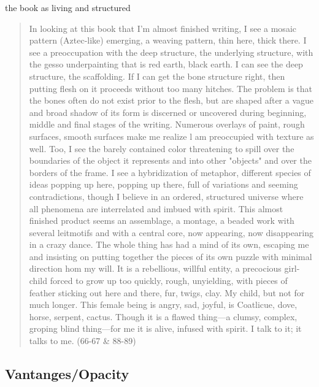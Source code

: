 \documentclass[11pt]{article}
\begin{document}
the book as living and structured
\begin{quote}
In looking at this book that I’m almost finished writing, I see a
mosaic pattern (Aztec-like) emerging, a weaving pattern, thin here,
thick there. I see a preoccupation with the deep structure, the
underlying structure, with the gesso underpainting that is red earth,
black earth. I can see the deep structure, the scaffolding. If I can
get the bone structure right, then putting flesh on it proceeds
without too many hitches. The problem is that the bones often do not
exist prior to the flesh, but are shaped after a vague and broad
shadow of its form is discerned or uncovered during beginning, middle
and final stages of the writing. Numerous overlays of paint, rough
surfaces, smooth surfaces make me realize l am preoccupied with
texture as well. Too, I see the barely contained color threatening to
spill over the boundaries of the object it represents and into other
"objects" and over the borders of the frame. I see a hybridization of
metaphor, different species of ideas popping up here, popping up
there, full of variations and seeming contradictions, though I believe
in an ordered, structured universe where all phenomena are
interrelated and imbued with spirit. This almost finished product
seems an assemblage, a montage, a beaded work with several leitmotifs
and with a central core, now appearing, now disappearing in a crazy
dance. The whole thing has had a mind of its own, escaping me and
insisting on putting together the pieces of its own puzzle with
minimal direction hom my will. It is a rebellious, willful entity, a
precocious girl-child forced to grow up too quickly, rough,
unyielding, with pieces of feather sticking out here and there, fur,
twigs, clay. My child, but not for much longer. This female being is
angry, sad, joyful, is Coatlicue, dove, horse, serpent, cactus. Though
it is a flawed thing---a clumsy, complex, groping blind thing---for me
it is alive, infused with spirit. I talk to it; it talks to me. (66-67
\& 88-89)
\end{quote}




\subsection{Vantanges/Opacity}
\label{sec:orge4ee3e8}
\end{document}
